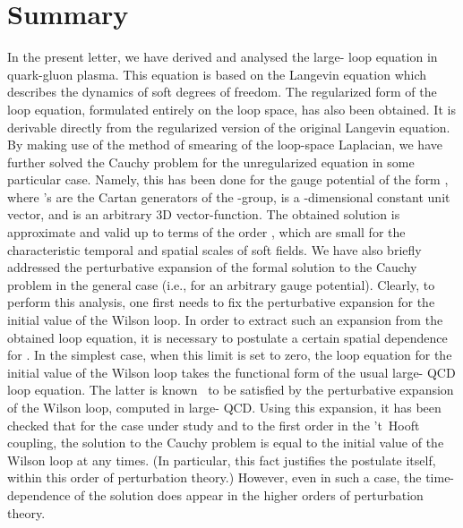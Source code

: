 \documentclass[a4paper,12pt]{article}
\begin{document}
\section{Summary}
In the present letter, we have derived and analysed the large-\coordHE{} loop equation in quark-gluon plasma. This
equation is based on the Langevin equation which describes the dynamics of soft degrees of freedom. The regularized
form of the loop equation, formulated  entirely on the loop space, has also been obtained. It is derivable directly
from the regularized version of the original Langevin equation. By making use of the method of smearing of the loop-space Laplacian,
we have further solved the Cauchy problem for the unregularized equation in some particular case. Namely, this has been done for the
gauge potential of the form \coordHE{}, where \coordHE{}'s are the Cartan generators of the \coordHE{}-group,
\coordHE{} is a \coordHE{}-dimensional constant unit vector, and \coordHE{} is an arbitrary 3D vector-function.
The obtained solution is approximate and valid up to terms of the order
\coordHE{}, which are small for the characteristic temporal and spatial scales of
soft fields. We have also briefly addressed the perturbative expansion of the formal solution to the Cauchy problem
in the general case (i.e., for an arbitrary gauge potential). Clearly, to perform this analysis, one first needs to fix
the perturbative expansion for the initial value of the Wilson loop. In order to extract such an expansion from the
obtained loop equation, it is necessary to postulate a certain spatial dependence for \coordHE{}. In the simplest case,
when this limit is set to zero, the loop equation for the initial value of the Wilson loop takes the functional
form of the usual large-\coordHE{} QCD loop equation. The latter is known~\cite{le, rev} to be satisfied by the
perturbative expansion of the Wilson loop, computed in large-\coordHE{} QCD. Using this expansion, it has been checked that
for the case  \coordHE{} under study and to the first order in the
't~Hooft coupling, the solution to the Cauchy problem is equal to the initial value of the Wilson loop at any times.
(In particular, this fact justifies the postulate \coordHE{} itself, within this order of perturbation theory.)
However, even in such a case, the time-dependence of the solution does appear in the higher orders of perturbation theory.
\end{document}
